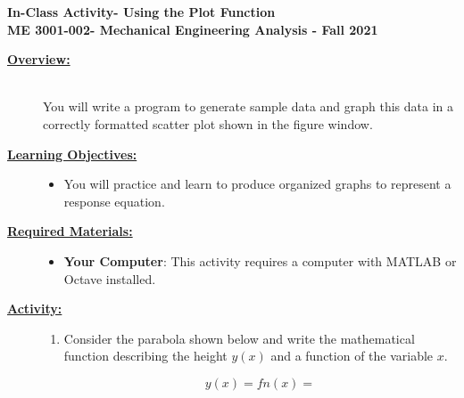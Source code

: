 \documentclass[12pt]{article}
\newcommand{\COURNAME}{ME 3001-002}
\newcommand{\CURRTERM}{Fall 2021} %
\newcommand{\MNUM}{1} %
\newcommand{\activitytitle}{Using the Plot Function} %
\begin{document}
\thispagestyle{plain}

\begin{center}
   {\bf \Large In-Class Activity\hspc\MNUM\hspc - \activitytitle}\vspace{3mm}\\
   {\bf \large \COURNAME - Mechanical Engineering Analysis - \CURRTERM} \vspace{5mm}\\
\end{center}

\begin{description}

\item[\textbf{\underline{Overview:}}] \hfill \vspace{3mm}\\
You will write a program to generate sample data and graph this data in a correctly formatted scatter plot shown in the figure window.

\item[\textbf{\underline{Learning Objectives:}}] \hfill \vspace{0mm}

\begin{itemize}
	\item You will practice and learn to produce organized graphs to represent a response equation. 
\end{itemize}

\item[\textbf{\underline{Required Materials:}}] \hfill \vspace{0mm}

\begin{itemize}
	\item {\bf Your Computer}: This activity requires a computer with MATLAB or Octave installed.
\end{itemize}

\item[\textbf{\underline{Activity:}}] \hfill \vspace{0mm}

\begin{enumerate}
	

	\item Consider the parabola shown below and write the mathematical function describing the height $y(x)$ and a function of the variable $x$.
	\begin{multicols}{2}

	\[ y(x)=fn(x)= \]



\end{multicols}
\end{enumerate}
\end{description}
\end{document}
